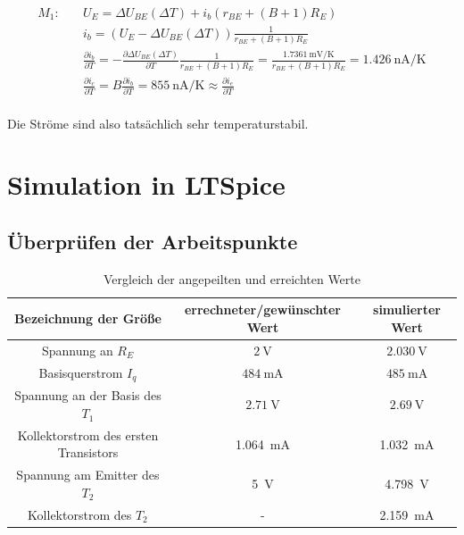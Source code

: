 \begin{align*}
    M_1:& \quad U_E = \Delta U_{BE}(\Delta T) + i_b \left( r_{BE} + (B+1) R_E \right) \\
    & \quad i_b = (U_E - \Delta U_{BE}(\Delta T)) \frac{1}{r_{BE} + (B+1) R_E} \\
     & \quad \frac{\partial i_b}{\partial T} = -\frac{\partial \Delta U_{BE}(\Delta T)}{\partial T} \frac{1}{r_{BE} + (B+1) R_E}
     = \frac{\SI{1.7361}{\milli \volt \per \kelvin}}{r_{BE} + (B+1) R_E} = \SI{1.426}{\nano \ampere \per \kelvin}\\
    &  \quad \frac{\partial i_c}{\partial T} = B \frac{\partial i_b}{\partial T} = \SI{855}{\nano \ampere \per \kelvin} \approx \frac{\partial i_e}{\partial T}\\
\end{align*}

Die Ströme sind also tatsächlich sehr temperaturstabil.

\section{Simulation in LTSpice}

\subsection{Überprüfen der Arbeitspunkte}

\begin{table}[H]
    \centering
    \begin{tabular}{|c|c|c|}
    \hline
         Bezeichnung der Größe & errechneter/gewünschter Wert & simulierter Wert \\ \hline \hline
         Spannung an $R_E$ & $\SI{2}{\volt}$ & $\SI{2.030}{\volt}$ \\ \hline
         Basisquerstrom $I_q$ & $\SI{484}{\milli \ampere}$ & $\SI{485}{\milli \ampere}$ \\ \hline
         Spannung an der Basis des $T_1$ & $\SI{2.71}{\volt}$ & $\SI{2.69}{\volt}$ \\ \hline
         Kollektorstrom des ersten Transistors& \SI{1.064}{\milli \ampere} & \SI{1.032}{\milli \ampere} \\ \hline
         Spannung am Emitter des $T_2$ & \SI{5}{\volt} & \SI{4.798}{\volt} \\ \hline
         Kollektorstrom des $T_2$ & - & \SI{2.159}{\milli \ampere} \\ \hline
    \end{tabular}
    \caption{Vergleich der angepeilten und erreichten Werte}
    \label{tab:my_label}
\end{table}

